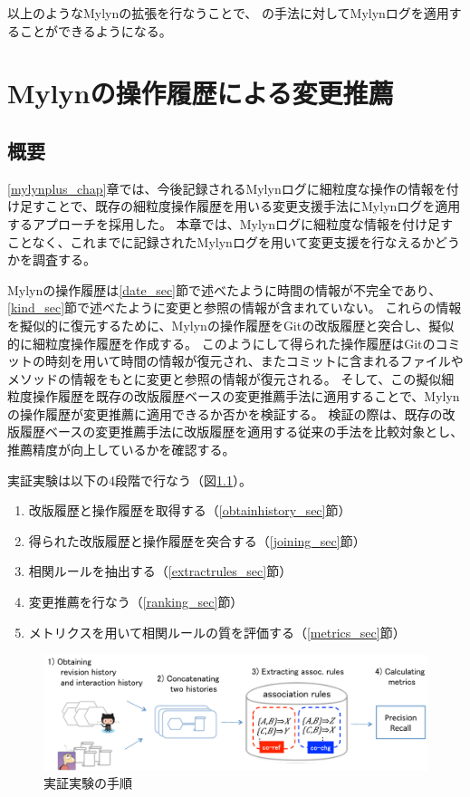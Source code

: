 \documentclass[a4paper]{jsbook}
\begin{document}
以上のようなMylynの拡張を行なうことで、
\cite{6233415,KatoJapanese:2011,ss2012-76,ss2013-84,Yamamori:2016}の手法に対してMylynログを適用することができるようになる。

\chapter{Mylynの操作履歴による変更推薦}\label{experiment_chap}
\section{概要}
\ref{mylynplus_chap}章では、今後記録されるMylynログに細粒度な操作の情報を付け足すことで、既存の細粒度操作履歴を用いる変更支援手法にMylynログを適用するアプローチを採用した。
本章では、Mylynログに細粒度な情報を付け足すことなく、これまでに記録されたMylynログを用いて変更支援を行なえるかどうかを調査する。

Mylynの操作履歴は\ref{date_sec}節で述べたように時間の情報が不完全であり、\ref{kind_sec}節で述べたように変更と参照の情報が含まれていない。
これらの情報を擬似的に復元するために、Mylynの操作履歴をGitの改版履歴と突合し、擬似的に細粒度操作履歴を作成する。
このようにして得られた操作履歴はGitのコミットの時刻を用いて時間の情報が復元され、またコミットに含まれるファイルやメソッドの情報をもとに変更と参照の情報が復元される。
そして、この擬似細粒度操作履歴を既存の改版履歴ベースの変更推薦手法に適用することで、Mylynの操作履歴が変更推薦に適用できるか否かを検証する。
検証の際は、既存の改版履歴ベースの変更推薦手法に改版履歴を適用する従来の手法を比較対象とし、推薦精度が向上しているかを確認する。

実証実験は以下の4段階で行なう（図\ref{procedure}）。
\begin{enumerate}
  \item 改版履歴と操作履歴を取得する（\ref{obtainhistory_sec}節）
  \item 得られた改版履歴と操作履歴を突合する（\ref{joining_sec}節）
  \item 相関ルールを抽出する（\ref{extractrules_sec}節）
  \item 変更推薦を行なう（\ref{ranking_sec}節）
  \item メトリクスを用いて相関ルールの質を評価する（\ref{metrics_sec}節）
\end{enumerate}
\begin{figure}[tb]
  \centering
  \includegraphics[width = \linewidth]{resource/procedure.pdf}
  \caption{実証実験の手順}
  \label{procedure}
\end{figure}
\end{document}
